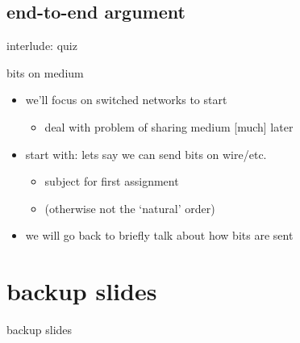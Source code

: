 \subsection{end-to-end argument}



\begin{frame}{interlude: quiz}
\end{frame}

\begin{frame}{bits on medium}
    \begin{itemize}
    \item we'll focus on switched networks to start
        \begin{itemize}
        \item deal with problem of sharing medium [much] later
        \end{itemize}
    \item start with: lets say we can send bits on wire/etc.
        \begin{itemize}
        \item subject for first assignment
        \item (otherwise not the `natural' order)
        \end{itemize}
    \item we will go back to briefly talk about how bits are sent
    \end{itemize}
\end{frame}





\section{backup slides}
\begin{frame}{backup slides}
\end{frame}


